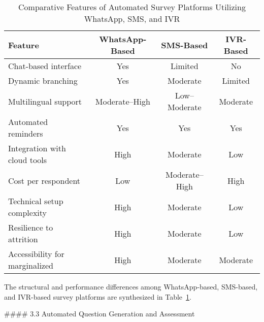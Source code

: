 \documentclass[11pt]{article}
\begin{document}
\begin{table}[ht]
\centering
\caption{Comparative Features of Automated Survey Platforms Utilizing WhatsApp, SMS, and IVR}
\begin{tabular}{|l|c|c|c|}
\hline
\textbf{Feature} & \textbf{WhatsApp-Based} & \textbf{SMS-Based} & \textbf{IVR-Based} \\
\hline
Chat-based interface & Yes & Limited & No \\
Dynamic branching & Yes & Moderate & Limited \\
Multilingual support & Moderate–High & Low–Moderate & Moderate \\
Automated reminders & Yes & Yes & Yes \\
Integration with cloud tools & High & Moderate & Low \\
Cost per respondent & Low & Moderate–High & High \\
Technical setup complexity & High & Moderate & Low \\
Resilience to attrition & High & Moderate & Low \\
Accessibility for marginalized & High & Moderate & Moderate \\
\hline
\end{tabular}
\label{tab:platform_comparison}
\end{table}

The structural and performance differences among WhatsApp-based, SMS-based, and IVR-based survey platforms are synthesized in Table~\ref{tab:platform_comparison}.

#### 3.3 Automated Question Generation and Assessment
\end{document}
